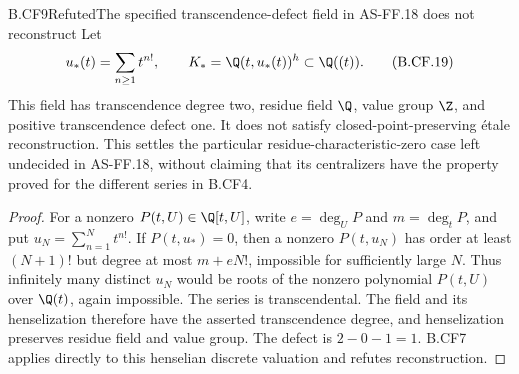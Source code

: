 \begin{claim}{B.CF9}{Refuted}{The specified transcendence-defect field in AS-FF.18 does not reconstruct}
Let
\[
     u_*(t)=\sum_{n\geq1}t^{n!},\qquad
     K_* =\Q(t,u_*(t))^h\subset\Q((t)).                  \tag{B.CF.19}
\]
This field has transcendence degree two, residue field \(\Q\),
value group \(\Z\), and positive transcendence defect one.
It does not satisfy closed-point-preserving étale reconstruction.
This settles the particular residue-characteristic-zero case
left undecided in AS-FF.18, without claiming that its centralizers
have the property proved for the different series in B.CF4.
\end{claim}
\begin{proof}
For a nonzero \(P(t,U)\in\Q[t,U]\), write \(e=\deg_U P\)
and \(m=\deg_t P\), and put
\(u_N=\sum_{n=1}^N t^{n!}\). If \(P(t,u_*)=0\), then a
nonzero \(P(t,u_N)\) has order at least \((N+1)!\) but degree
at most \(m+eN!\), impossible for sufficiently large \(N\).
Thus infinitely many distinct \(u_N\) would be roots of the
nonzero polynomial \(P(t,U)\) over \(\Q(t)\), again impossible.
The series is transcendental. The field and its henselization
therefore have the asserted transcendence degree, and
henselization preserves residue field and value group.
The defect is \(2-0-1=1\). B.CF7 applies directly to this
henselian discrete valuation and refutes reconstruction.
\end{proof}

